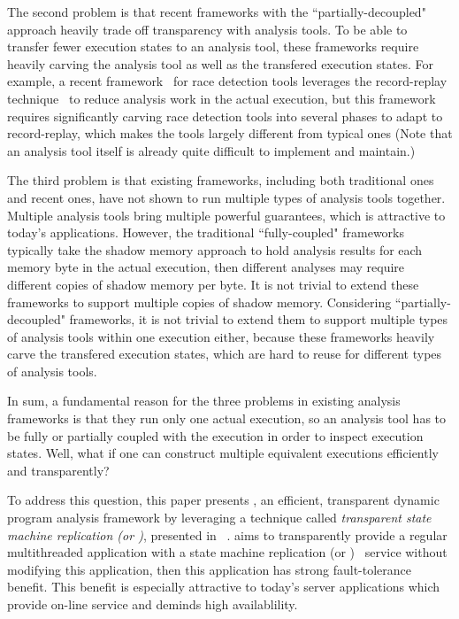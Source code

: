 The second problem is that recent frameworks with the ``partially-decoupled"
approach heavily trade off transparency with analysis tools. To be able to
transfer fewer execution states to an analysis tool, these frameworks require
heavily carving the analysis tool as well as the transfered execution states.
For example, a recent framework~\cite{wester:parallelizing:asplos13} for race
detection tools leverages the record-replay
technique~\cite{scribe:sigmetrics2010, respec:asplos10, racepro:sosp11} to
reduce analysis work in the actual execution, but this framework
requires significantly carving race detection tools into several phases to adapt
to record-replay, which makes the tools largely different from typical ones
(Note that an analysis tool itself is already quite difficult to implement and
maintain.)


The third problem is that existing frameworks, including both traditional ones
and recent ones, have not shown to run multiple types of analysis tools 
together. Multiple analysis tools bring multiple powerful
guarantees, which is attractive to today's applications. However, the
traditional ``fully-coupled" frameworks typically take the shadow memory 
approach to hold analysis results for each memory byte in the actual execution, 
then different analyses may require different copies of shadow memory per byte. 
It is not trivial to extend these frameworks to support multiple copies of 
shadow memory. Considering ``partially-decoupled" frameworks, it is not trivial 
to extend them to support multiple types of analysis tools within one execution 
either, because these frameworks heavily carve the transfered execution states, 
which are hard to reuse for different types of analysis tools.


In sum, a fundamental reason for the three problems in existing analysis 
frameworks is that they run only one actual execution, so an analysis tool has
to be fully or partially coupled with the execution in order to inspect
execution states. Well, what if one can construct multiple equivalent
executions efficiently and transparently?




To address this question, this paper presents \xxx, an efficient, 
transparent dynamic program analysis framework by leveraging a technique called 
\emph{transparent state machine replication (or \tsmr)}, presented in 
\repbox~\cite{repbox:sosp15}. \tsmr aims to transparently provide a regular 
multithreaded application with a state machine replication (or 
\smr)~\cite{paxos:simple, paxos:practical, paxos} service without modifying 
this application, then this application has strong fault-tolerance benefit. 
This benefit is especially attractive to today's server applications which 
provide on-line service and deminds high availablility.



